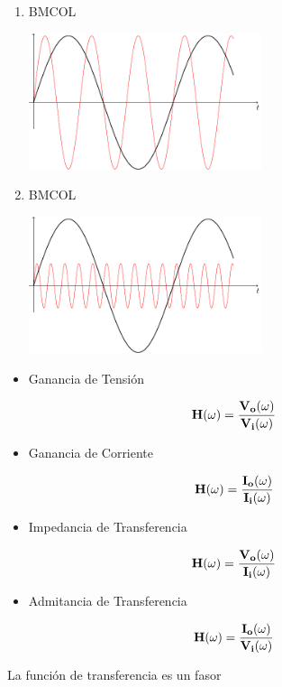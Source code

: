 \begin{enumerate}
\item \hfill{}\textsc{BMCOL}
\label{sec:orge6450a2}
\begin{center}
\includegraphics[height=4cm]{../figs/sinX.pdf}
\end{center}

\item \hfill{}\textsc{BMCOL}
\label{sec:org4f673b6}
\begin{center}
\includegraphics[height=4cm]{../figs/sinY.pdf}
\end{center}
\end{enumerate}


\begin{itemize}
\item Ganancia de Tensión
\end{itemize}
\[
\mathbf{H}(\omega) =\frac{\mathbf{V_o}(\omega)}{\mathbf{V_i}(\omega)}
\]
\begin{itemize}
\item Ganancia de Corriente
\end{itemize}
\[
\mathbf{H}(\omega) =\frac{\mathbf{I_o}(\omega)}{\mathbf{I_i}(\omega)}
\]
\begin{itemize}
\item Impedancia de Transferencia
\end{itemize}
\[
\mathbf{H}(\omega) =\frac{\mathbf{V_o}(\omega)}{\mathbf{I_i}(\omega)}
\]
\begin{itemize}
\item Admitancia de Transferencia
\end{itemize}
\[
\mathbf{H}(\omega) =\frac{\mathbf{I_o}(\omega)}{\mathbf{V_i}(\omega)}
\]

{La función de transferencia es un fasor}
\label{sec:orgd97d35b}


